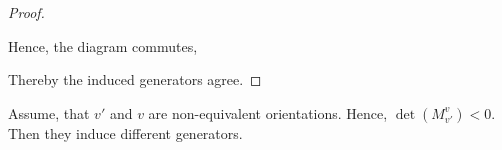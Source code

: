 \begin{proof}
\begin{center}
\end{center}
Hence, the diagram commutes, 
\begin{center}
\end{center}
Thereby the induced generators agree.
\end{proof}
\begin{lemma}
    Assume, that $v'$ and $v$ are non-equivalent orientations. Hence, $\det(M^v_{v'})<0$. Then they induce different generators.
\end{lemma}
